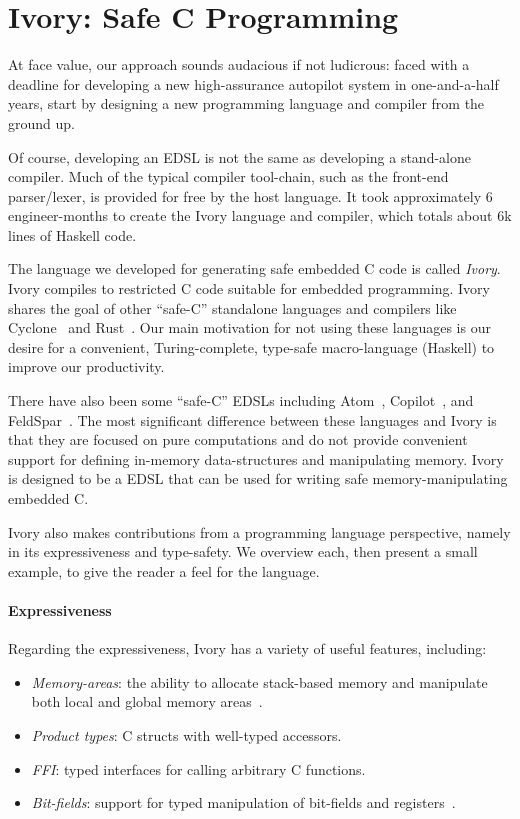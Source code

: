 \section{Ivory: Safe C Programming}
\label{sec:ivory}

At face value, our approach sounds audacious if not ludicrous: faced with a
deadline for developing a new high-assurance autopilot system in one-and-a-half
years, start by designing a new programming language and compiler from the
ground up.

Of course, developing an EDSL is not the same as developing a stand-alone
compiler.  Much of the typical compiler tool-chain, such as the front-end
parser/lexer, is provided for free by the host language.  It took approximately
6 engineer-months to create the Ivory language and compiler, which totals about
6k lines of Haskell code.

The language we developed for generating safe embedded C code is called
\emph{Ivory}.  Ivory compiles to restricted C code suitable for embedded
programming.  Ivory shares the goal of other ``safe-C'' standalone languages and
compilers like Cyclone~\cite{cyclone} and Rust~\cite{rust}.  Our main motivation
for not using these languages is our desire for a convenient, Turing-complete,
type-safe macro-language (Haskell) to improve our productivity.

There have also been some ``safe-C'' EDSLs including Atom~\cite{atom},
Copilot~\cite{copilot}, and FeldSpar~\cite{feldspar1}.  The most significant
difference between these languages and Ivory is that they are focused on pure
computations and do not provide convenient support for defining in-memory
data-structures and manipulating memory.  Ivory is designed to be a
EDSL that can be used for writing safe memory-manipulating embedded C.

Ivory also makes  contributions from a programming language
perspective, namely in its expressiveness and type-safety.  We overview each,
then present a small example, to give the reader a feel for the language.

\paragraph{Expressiveness}
Regarding the expressiveness, Ivory has a variety of useful features, including:
\begin{itemize}
  \item \emph{Memory-areas}: the ability to allocate stack-based memory and
    manipulate both local and global memory areas~\cite{memareas}.
  \item \emph{Product types}: C structs with well-typed accessors.
  \item \emph{FFI}: typed interfaces for calling arbitrary C functions.
  \item \emph{Bit-fields}: support for typed manipulation of bit-fields and
    registers~\cite{high-level}.
\end{itemize}

